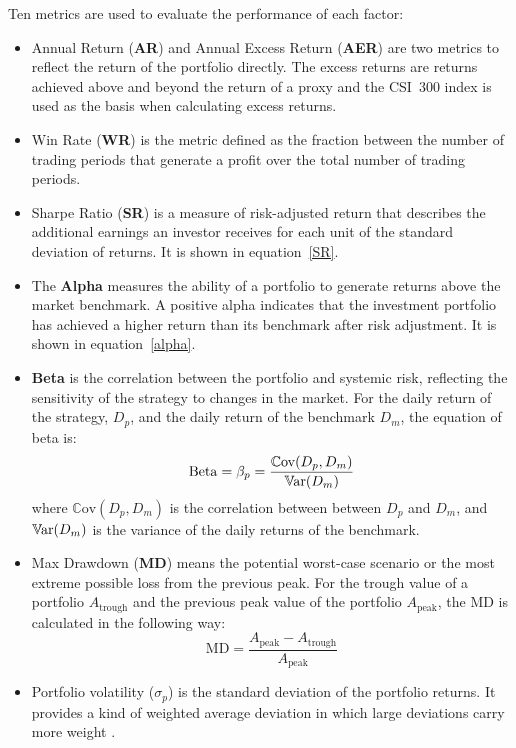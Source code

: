 \documentclass[preprint,12pt]{elsarticle}
\begin{document}
\noindent Ten metrics are used to evaluate the performance of each factor:
\begin{itemize}[label={\textbullet}]
  \item Annual Return (\textbf{AR}) and Annual Excess Return (\textbf{AER}) are two metrics to reflect the return of the portfolio directly. The excess returns are returns achieved above and beyond the return of a proxy and the CSI~300 index is used as the basis when calculating excess returns.
  \item Win Rate (\textbf{WR}) is the metric defined as the fraction between the number of trading periods that generate a profit over the total number of trading periods. 
  \item Sharpe Ratio (\textbf{SR}) is a measure of risk-adjusted return that describes the additional earnings an investor receives for each unit of the standard deviation of returns. It is shown in equation~\eqref{SR}. 
  \item The \textbf{Alpha} measures the ability of a portfolio to generate returns above the market benchmark. A positive alpha indicates that the investment portfolio has achieved a higher return than its benchmark after risk adjustment. It is shown in equation~\eqref{alpha}.
  \item \textbf{Beta} is the correlation between the portfolio and systemic risk, reflecting the sensitivity of the strategy to changes in the market. For the daily return of the strategy, $D_p$, and the daily return of the benchmark $D_m$, the equation of beta is:
  $$ \mathrm{Beta} = \beta_p = \frac{\mathbb{C}\mathrm{ov}(D_p, D_m)}{\mathbb{V}\hspace{-0.084em}\mathrm{ar}(D_m)}$$
  where $\mathbb{C}\mathrm{ov}(D_p, D_m)$ is the correlation between between $D_p$ and $D_m$, and $\mathbb{V}\hspace{-0.084em}\mathrm{ar}(D_m)$ is the variance of the daily returns of the benchmark.
  \item Max Drawdown (\textbf{MD}) means the potential worst-case scenario or the most extreme possible loss from the previous peak. For the trough value of a portfolio $A_{\mathrm{trough}}$ and the previous peak value of the portfolio $A_{\mathrm{peak}}$, the MD is calculated in the following way:
   $$ \mathrm{MD} = \frac{A_{\mathrm{peak}} - A_{\mathrm{trough}}}{A_{\mathrm{peak}}}$$
  \item Portfolio volatility ($\sigma_p$) is the standard deviation of the portfolio returns. It provides a kind of weighted average deviation in which large deviations carry more weight \citep{bacon2023practical}. 

\end{itemize}
\end{document}

